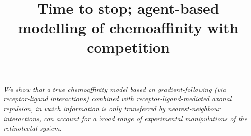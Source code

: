 \documentclass[11pt, a4paper]{article}
\title {
Time to stop; agent-based modelling of chemoaffinity with competition
}
\date{} %
\author{\Authors}
\begin{document}
\maketitle

\emph{We show that a true chemoaffinity model based on gradient-following (via receptor-ligand interactions) combined with receptor-ligand-mediated axonal repulsion, in which information is only transferred by nearest-neighbour interactions, can account for a broad range of experimental manipulations of the retinotectal system.}



\end{document}
